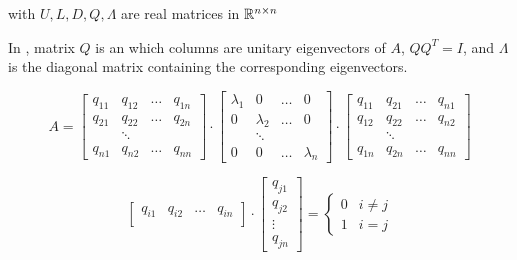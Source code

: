 \documentclass[a4paper,twoside,justified]{tufte-handout}
\begin{document}
with $ U,L,D,Q,\Lambda $ are real matrices in $ \mathbb{R}^{n\times n} $

In , matrix $ Q $ is an
 which columns are unitary
eigenvectors of $ A $, \ie $ QQ^{T} = I$, and $ \Lambda $ is the
diagonal matrix containing the corresponding eigenvectors.

\begin{figure*}
\begin{equation}
A=
\begin{bmatrix}
    q_{11}  & q_{12} & \ldots & q_{1n}\\
    q_{21}  & q_{22} & \ldots & q_{2n}\\
    & \ddots & &  \\
    q_{n1}  & q_{n2} & \ldots & q_{nn}
\end{bmatrix}%
\cdot
\begin{bmatrix}
    \lambda_{1}  & 0 & \ldots & 0\\
    0 & \lambda_{2} & \ldots & 0\\
    & \ddots & &  \\
    0  & 0 & \ldots & \lambda_{n}
\end{bmatrix}
\cdot
\begin{bmatrix}
    q_{11}  & q_{21} & \ldots & q_{n1}\\
    q_{12}  & q_{22} & \ldots & q_{n2}\\
    & \ddots & &  \\
    q_{1n}  & q_{2n} & \ldots & q_{nn}
\end{bmatrix}
\end{equation}
\end{figure*}

\begin{equation}
  \begin{bmatrix}
    q_{i1}  & q_{i2} & \ldots & q_{in}\\
   \end{bmatrix}
  \cdot
  \begin{bmatrix}
    q_{j1}  \\
    q_{j2}  \\
    \vdots \\
    q_{jn} 
  \end{bmatrix} = \begin{cases}
    0 & i\neq j\\
    1 & i = j
  \end{cases}
\end{equation}
\end{document}
